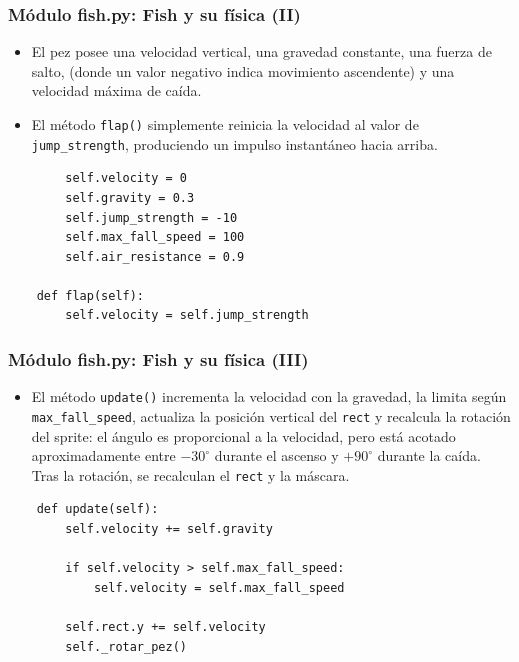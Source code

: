 \documentclass[
	11pt, %
]{beamer}
\begin{document}
\begin{frame}[fragile]
\frametitle{Módulo fish.py: Fish y su física (II)}

\begin{itemize}
    \item El pez posee una velocidad vertical, una gravedad constante, una fuerza de salto, (donde un valor negativo indica movimiento ascendente) y una velocidad máxima de caída.
    \item El método \texttt{flap()} simplemente reinicia la velocidad al valor de \texttt{jump\_strength}, produciendo un impulso instantáneo hacia arriba.
\end{itemize}

{\scriptsize
\begin{verbatim}
        self.velocity = 0
        self.gravity = 0.3
        self.jump_strength = -10
        self.max_fall_speed = 100
        self.air_resistance = 0.9

    def flap(self):
        self.velocity = self.jump_strength
\end{verbatim}
}
\end{frame}


\begin{frame}[fragile]
\frametitle{Módulo fish.py: Fish y su física (III)}

\begin{itemize}
    \item El método \texttt{update()} incrementa la velocidad con la gravedad, la limita según \texttt{max\_fall\_speed}, actualiza la posición vertical del \texttt{rect} y recalcula la rotación del sprite: el ángulo es proporcional a la velocidad, pero está acotado aproximadamente entre $-30^\circ$ durante el ascenso y $+90^\circ$ durante la caída. Tras la rotación, se recalculan el \texttt{rect} y la máscara.
\end{itemize}

{\scriptsize
\begin{verbatim}
    def update(self):
        self.velocity += self.gravity

        if self.velocity > self.max_fall_speed:
            self.velocity = self.max_fall_speed

        self.rect.y += self.velocity
        self._rotar_pez()

\end{verbatim}
}
\end{frame}
\end{document}

